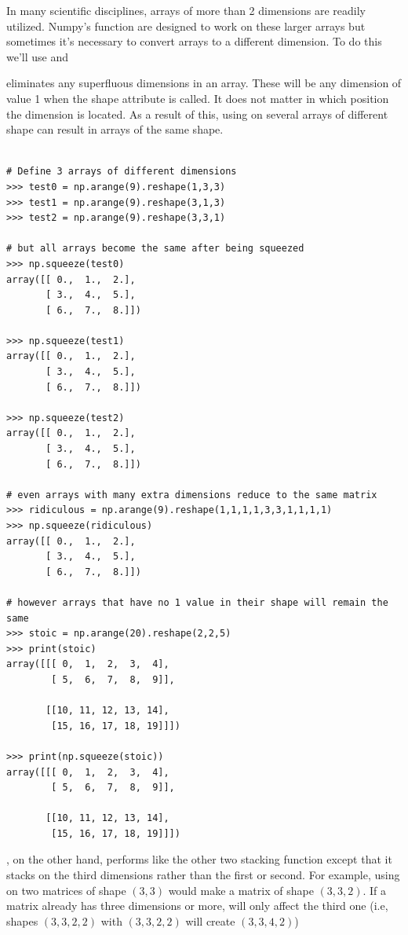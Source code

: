 In many scientific disciplines, arrays of more than 2 dimensions are readily utilized. Numpy's function are designed to work on these larger arrays but sometimes it's necessary to convert arrays to a different dimension. To do this we'll use  and 

 eliminates any superfluous dimensions in an array. These will be any dimension of value 1 when the shape attribute is called. It does not matter in which position the dimension is located. As a result of this, using  on several arrays of different shape can result in arrays of the same shape.

\begin{lstlisting}

# Define 3 arrays of different dimensions
>>> test0 = np.arange(9).reshape(1,3,3)
>>> test1 = np.arange(9).reshape(3,1,3)
>>> test2 = np.arange(9).reshape(3,3,1)

# but all arrays become the same after being squeezed
>>> np.squeeze(test0)
array([[ 0.,  1.,  2.],
       [ 3.,  4.,  5.],
       [ 6.,  7.,  8.]])

>>> np.squeeze(test1)
array([[ 0.,  1.,  2.],
       [ 3.,  4.,  5.],
       [ 6.,  7.,  8.]])

>>> np.squeeze(test2)
array([[ 0.,  1.,  2.],
       [ 3.,  4.,  5.],
       [ 6.,  7.,  8.]])

# even arrays with many extra dimensions reduce to the same matrix
>>> ridiculous = np.arange(9).reshape(1,1,1,1,3,3,1,1,1,1)
>>> np.squeeze(ridiculous)
array([[ 0.,  1.,  2.],
       [ 3.,  4.,  5.],
       [ 6.,  7.,  8.]])

# however arrays that have no 1 value in their shape will remain the same
>>> stoic = np.arange(20).reshape(2,2,5)
>>> print(stoic)
array([[[ 0,  1,  2,  3,  4],
        [ 5,  6,  7,  8,  9]],

       [[10, 11, 12, 13, 14],
        [15, 16, 17, 18, 19]]])

>>> print(np.squeeze(stoic))
array([[[ 0,  1,  2,  3,  4],
        [ 5,  6,  7,  8,  9]],

       [[10, 11, 12, 13, 14],
        [15, 16, 17, 18, 19]]])

\end{lstlisting} 

, on the other hand, performs like the other two stacking function except that it stacks on the third dimensions rather than the first or second. For example, using  on two matrices of shape $(3,3)$ would make a matrix of shape $(3,3,2)$. If a matrix already has three dimensions or more,  will only affect the third one (i.e, shapes $(3,3,2,2)$ with $(3,3,2,2)$ will create $(3,3,4,2)$)

